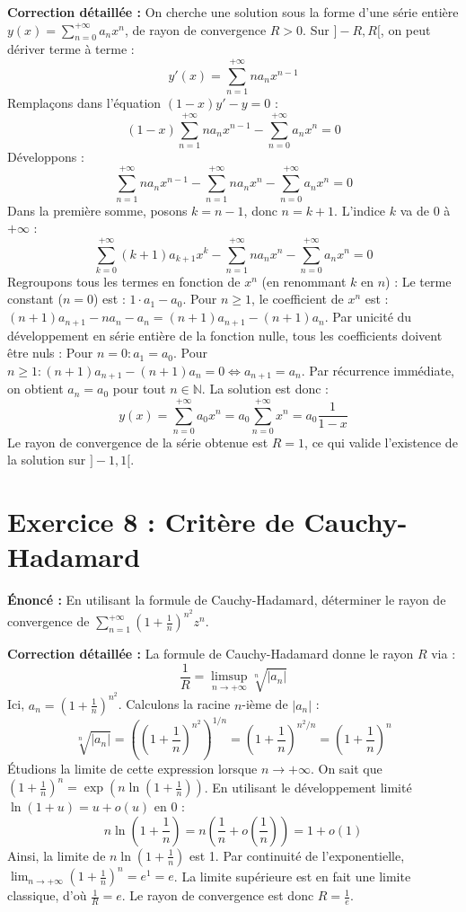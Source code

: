 \documentclass{report}
\begin{document}
\textbf{Correction détaillée :}
On cherche une solution sous la forme d'une série entière $y(x) = \sum_{n=0}^{+\infty} a_n x^n$, de rayon de convergence $R>0$.
Sur $]-R, R[$, on peut dériver terme à terme :
$$ y'(x) = \sum_{n=1}^{+\infty} n a_n x^{n-1} $$
Remplaçons dans l'équation $(1-x)y' - y = 0$ :
$$ (1-x) \sum_{n=1}^{+\infty} n a_n x^{n-1} - \sum_{n=0}^{+\infty} a_n x^n = 0 $$
Développons :
$$ \sum_{n=1}^{+\infty} n a_n x^{n-1} - \sum_{n=1}^{+\infty} n a_n x^n - \sum_{n=0}^{+\infty} a_n x^n = 0 $$
Dans la première somme, posons $k = n-1$, donc $n = k+1$. L'indice $k$ va de 0 à $+\infty$ :
$$ \sum_{k=0}^{+\infty} (k+1) a_{k+1} x^k - \sum_{n=1}^{+\infty} n a_n x^n - \sum_{n=0}^{+\infty} a_n x^n = 0 $$
Regroupons tous les termes en fonction de $x^n$ (en renommant $k$ en $n$) :
Le terme constant ($n=0$) est : $1 \cdot a_1 - a_0$.
Pour $n \geq 1$, le coefficient de $x^n$ est : $(n+1)a_{n+1} - n a_n - a_n = (n+1)a_{n+1} - (n+1)a_n$.
Par unicité du développement en série entière de la fonction nulle, tous les coefficients doivent être nuls :
Pour $n=0 : a_1 = a_0$.
Pour $n \geq 1 : (n+1)a_{n+1} - (n+1)a_n = 0 \iff a_{n+1} = a_n$.
Par récurrence immédiate, on obtient $a_n = a_0$ pour tout $n \in \mathbb{N}$.
La solution est donc :
$$ y(x) = \sum_{n=0}^{+\infty} a_0 x^n = a_0 \sum_{n=0}^{+\infty} x^n = a_0 \frac{1}{1-x} $$
Le rayon de convergence de la série obtenue est $R=1$, ce qui valide l'existence de la solution sur $]-1, 1[$.

\newpage
\chapter*{Exercice 8 : Critère de Cauchy-Hadamard}

\textbf{Énoncé :}
En utilisant la formule de Cauchy-Hadamard, déterminer le rayon de convergence de $\sum_{n=1}^{+\infty} \left(1 + \frac{1}{n}\right)^{n^2} z^n$.

\textbf{Correction détaillée :}
La formule de Cauchy-Hadamard donne le rayon $R$ via :
$$ \frac{1}{R} = \limsup_{n \to +\infty} \sqrt[n]{|a_n|} $$
Ici, $a_n = \left(1 + \frac{1}{n}\right)^{n^2}$.
Calculons la racine $n$-ième de $|a_n|$ :
$$ \sqrt[n]{|a_n|} = \left( \left(1 + \frac{1}{n}\right)^{n^2} \right)^{1/n} = \left(1 + \frac{1}{n}\right)^{n^2/n} = \left(1 + \frac{1}{n}\right)^n $$
Étudions la limite de cette expression lorsque $n \to +\infty$.
On sait que $\left(1 + \frac{1}{n}\right)^n = \exp\left( n \ln\left(1 + \frac{1}{n}\right) \right)$.
En utilisant le développement limité $\ln(1+u) = u + o(u)$ en $0$ :
$$ n \ln\left(1 + \frac{1}{n}\right) = n \left( \frac{1}{n} + o\left(\frac{1}{n}\right) \right) = 1 + o(1) $$
Ainsi, la limite de $n \ln\left(1 + \frac{1}{n}\right)$ est 1.
Par continuité de l'exponentielle, $\lim_{n \to +\infty} \left(1 + \frac{1}{n}\right)^n = e^1 = e$.
La limite supérieure est en fait une limite classique, d'où $\frac{1}{R} = e$.
Le rayon de convergence est donc $R = \frac{1}{e}$.
\end{document}
